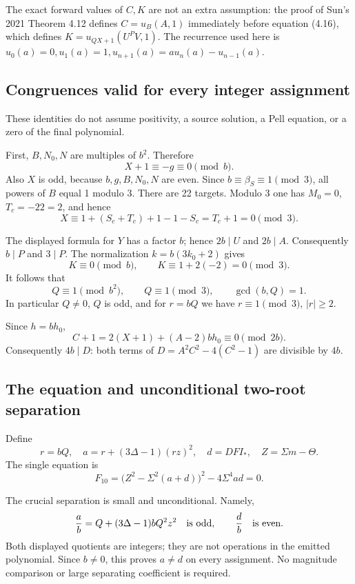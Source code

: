 The exact forward values of \(C,K\) are not an extra assumption: the
proof of Sun's 2021 Theorem 4.12 defines \(C=u_B(A,1)\) immediately
before equation (4.16), which defines \(K=u_{QX+1}(U^PV,1)\). The
recurrence used here is
\(u_0(a)=0,u_1(a)=1,u_{n+1}(a)=au_n(a)-u_{n-1}(a)\).

\subsection{Congruences valid for every integer
assignment}\label{congruences-valid-for-every-integer-assignment}

These identities do not assume positivity, a source solution, a Pell
equation, or a zero of the final polynomial.

First, \(B,N_0,N\) are multiples of \(b^2\). Therefore \[
 X+1\equiv-g\equiv0\pmod b.
\] Also \(X\) is odd, because \(b,g,B,N_0,N\) are even. Since
\(b\equiv\beta_S\equiv1\pmod3\), all powers of \(B\) equal 1 modulo 3.
There are 22 targets. Modulo 3 one has \(M_0=0\), \(T_c=-22=2\), and
hence \[
 X\equiv1+(S_c+T_c)+1-1-S_c=T_c+1=0\pmod3.
\]

The displayed formula for \(Y\) has a factor \(b\); hence \(2b\mid U\)
and \(2b\mid A\). Consequently \(b\mid P\) and \(3\mid P\). The
normalization \(k=b(3k_0+2)\) gives \[
 K\equiv0\pmod b,\qquad K\equiv1+2(-2)=0\pmod3.
\] It follows that \[
 Q\equiv1\pmod{b^2},\qquad Q\equiv1\pmod3,
 \qquad \gcd(b,Q)=1.
\] In particular \(Q\ne0\), \(Q\) is odd, and for \(r=bQ\) we have
\(r\equiv1\pmod3\), \(|r|\ge2\).

Since \(h=bh_0\), \[
 C+1=2(X+1)+(A-2)bh_0\equiv0\pmod{2b}.
\] Consequently \(4b\mid D\): both terms of \(D=A^2C^2-4(C^2-1)\) are
divisible by \(4b\).

\subsection{The equation and unconditional two-root
separation}\label{the-equation-and-unconditional-two-root-separation}

Define \[
 r=bQ,\quad a=r+(3\Delta-1)(rz)^2,
 \quad d=DFI_*,\quad Z=\Sigma m-\Theta.
\] The single equation is \[
 \boxed{F_{10}=\bigl(Z^2-\Sigma^2(a+d)\bigr)^2
                  -4\Sigma^4ad=0.}
\]

The crucial separation is small and unconditional. Namely, \[
 \frac ab=Q+(3\Delta-1)bQ^2z^2\quad\hbox{is odd},\qquad
 \frac db\quad\hbox{is even}.
\] Both displayed quotients are integers; they are not operations in the
emitted polynomial. Since \(b\ne0\), this proves \(a\ne d\) on every
assignment. No magnitude comparison or large separating coefficient is
required.

